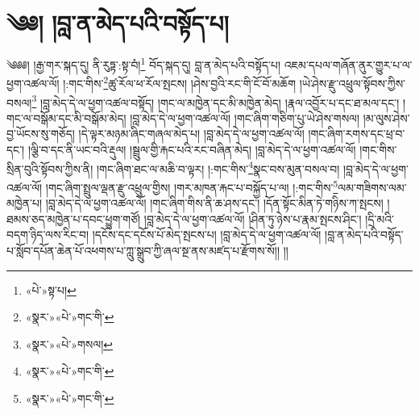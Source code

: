 \chapter{༄༅། །བླ་ན་མེད་པའི་བསྟོད་པ།}༄༅༅། །རྒྱ་གར་སྐད་དུ། ནི་རུཏྟ་:སྟ་བཾ།\footnote{«པེ་»སྟ་པ།} བོད་སྐད་དུ། བླ་ན་མེད་པའི་བསྟོད་པ། འཇམ་དཔལ་གཞོན་ནུར་གྱུར་པ་ལ་ཕྱག་འཚལ་ལོ། །:གང་གིས་\footnote{«སྣར་»«པེ་»གང་གི་}ཚུ་རོལ་ཕ་རོལ་སྤངས། །ཤེས་བྱའི་རང་གི་ངོ་བོ་མཆོག །ཡེ་ཤེས་རྫུ་འཕྲུལ་སྟོབས་ཀྱིས་བསལ།\footnote{«སྣར་»«པེ་»གསལ།} །བླ་མེད་དེ་ལ་ཕྱག་འཚལ་བསྟོད། །གང་ལ་མཁྱེན་དང་མི་མཁྱེན་མེད། །རྣལ་འབྱོར་པ་དང་ཐ་མལ་དང་། །གང་ལ་བསྒོམ་དང་མི་བསྒོམ་མེད། །བླ་མེད་དེ་ལ་ཕྱག་འཚལ་ལོ། །གང་ཞིག་གཅིག་པུ་ཡེ་ཤེས་གསལ། །མ་ལུས་ཤེས་བྱ་ཡོངས་སུ་གཅོད། །དེ་ལྟར་མཉམ་ཞིང་གཞལ་མེད་པ། །བླ་མེད་དེ་ལ་ཕྱག་འཚལ་ལོ། །གང་ཞིག་རགས་དང་ཕྲ་བ་དང་། །ལྕི་བ་དང་ནི་ཡང་བའི་རྡུལ། །སྦྲུལ་གྱི་རྐང་པའི་རང་བཞིན་མེད། །བླ་མེད་དེ་ལ་ཕྱག་འཚལ་ལོ། །གང་གིས་སྲིན་བུའི་སྟོབས་ཀྱིས་ནི། །གང་ཞིག་ཐང་ལ་མཆི་བ་ལྟར། །:གང་གིས་\footnote{«སྣར་»«པེ་»གང་གི་}སྣང་བས་མུན་བསལ་བ། །བླ་མེད་དེ་ལ་ཕྱག་འཚལ་ལོ། །གང་ཞིག་སྤྲུལ་ལྡན་རྫུ་འཕྲུལ་གྱིས། །གར་མཁན་རྐང་པ་བསྐྱོད་པ་ལ། །:གང་གིས་\footnote{«སྣར་»«པེ་»གང་གི་}ལམ་གཟིགས་ལམ་མཁྱེན་པ། །བླ་མེད་དེ་ལ་ཕྱག་འཚལ་ལོ། །གང་ཞིག་གིས་ནི་ཆ་ཤས་དང་། །དོན་སྟོང་མིན་ཏེ་གཉིས་ཀ་སྤངས། །ཐམས་ཅད་མཁྱེན་པ་དབང་ཕྱུག་གཙོ། །བླ་མེད་དེ་ལ་ཕྱག་འཚལ་ལོ། །ཤིན་ཏུ་ཉེས་པ་རྣམ་སྤངས་ཤིང་། །དྲི་མའི་བདག་ཉིད་ལས་རིང་བ། །དངོས་དང་དངོས་པོ་མེད་སྤངས་པ། །བླ་མེད་དེ་ལ་ཕྱག་འཚལ་ལོ། །བླ་ན་མེད་པའི་བསྟོད་པ་སློབ་དཔོན་ཆེན་པོ་འཕགས་པ་ཀླུ་སྒྲུབ་ཀྱི་ཞལ་སྔ་ནས་མཛད་པ་རྫོགས་སོ།། །།